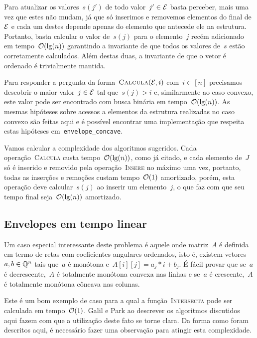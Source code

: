 Para atualizar os valores~$s(j')$ de todo valor~$j' \in \mathcal{E}$ basta perceber, mais uma vez que estes não mudam, já que só inserimos e removemos elementos do final de~$\mathcal{E}$ e cada um destes depende apenas do elemento que antecede ele na estrutura. Portanto, basta calcular o valor de~$s(j)$ para o elemento~$j$ recém adicionado em tempo~$\mathcal{O}(\lg(n))$ garantindo a invariante de que todos os valores de~$s$ estão corretamente calculados. Além destas duas, a invariante de que o vetor é ordenado é trivialmente mantida.

Para responder a pergunta da forma~${ \textsc{Calcula}(\mathcal{E},i) }$ com~$i \in [n]$ precisamos descobrir o maior valor~$j \in \mathcal{E}$ tal que~$s(j) > i$ e, similarmente ao caso convexo, este valor pode ser encontrado com busca binária em tempo~$\mathcal{O}(\lg(n))$. As mesmas hipóteses sobre acessos a elementos da estrutura realizadas no caso convexo são feitas aqui e é possível encontrar uma implementação que respeita estas hipóteses em~\texttt{envelope\_concave}. 

Vamos calcular a complexidade dos algoritmos sugeridos. Cada operação~\textsc{Calcula} custa tempo~$\mathcal{O}(\lg(n))$, como já citado, e cada elemento de~$J$ só é inserido e removido pela operação~\textsc{Insere} no máximo uma vez, portanto, todas as inserções e remoções custam tempo~$\mathcal{O}(1)$ amortizado, porém, esta operação deve calcular~$s(j)$ ao inserir um elemento~$j$, o que faz com que seu tempo final seja~$\mathcal{O}(\lg(n))$ amortizado.


\subsection{Envelopes em tempo linear} \label{Online:linear}

Um caso especial interessante deste problema é aquele onde matriz~$A$ é definida em termo de retas com coeficientes angulares ordenados, isto é, existem vetores~$a,b \in \mathbb{Q}^n$ tais que~$a$ é monótona e~$A[i][j] = a_j*i + b_j$. É fácil provar que se~$a$ é decrescente,~$A$ é totalmente monótona convexa nas linhas e se~$a$ é crescente,~$A$ é totalmente monótona côncava nas colunas.

Este é um bom exemplo de caso para a qual a função~\textsc{Intersecta} pode ser calculada em tempo~$\mathcal{O}(1)$. Galil e Park ao descrever os algoritmos discutidos aqui fazem com que a utilização deste fato se torne clara. Da forma como foram descritos aqui, é necessário fazer uma observação para atingir esta complexidade.

